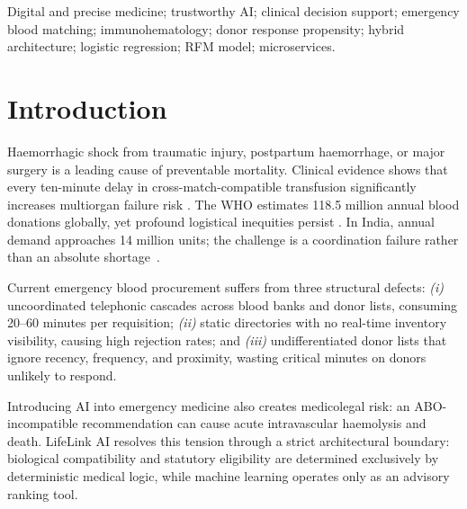 \documentclass[conference]{IEEEtran}
\begin{document}
\begin{IEEEkeywords}
Digital and precise medicine; trustworthy AI; clinical decision support;
emergency blood matching; immunohematology; donor response propensity;
hybrid architecture; logistic regression; RFM model; microservices.
\end{IEEEkeywords}

\section{Introduction}

Haemorrhagic shock from traumatic injury, postpartum haemorrhage, or
major surgery is a leading cause of preventable mortality. Clinical
evidence shows that every ten-minute delay in cross-match-compatible
transfusion significantly increases multiorgan failure risk
\cite{cotton2018,cole2019}. The WHO estimates 118.5 million annual
blood donations globally, yet profound logistical inequities persist
\cite{who2022}. In India, annual demand approaches 14 million units;
the challenge is a coordination failure rather than an absolute
shortage~\cite{nbtc2022}.

Current emergency blood procurement suffers from three structural
defects: \emph{(i)} uncoordinated telephonic cascades across blood
banks and donor lists, consuming 20--60 minutes per requisition;
\emph{(ii)} static directories with no real-time inventory visibility,
causing high rejection rates; and \emph{(iii)} undifferentiated donor
lists that ignore recency, frequency, and proximity, wasting critical
minutes on donors unlikely to respond.

Introducing AI into emergency medicine also creates medicolegal risk:
an ABO-incompatible recommendation can cause acute intravascular
haemolysis and death. LifeLink AI resolves this tension through a
strict architectural boundary: biological compatibility and statutory
eligibility are determined exclusively by deterministic medical logic,
while machine learning operates only as an advisory ranking tool.
\end{document}
